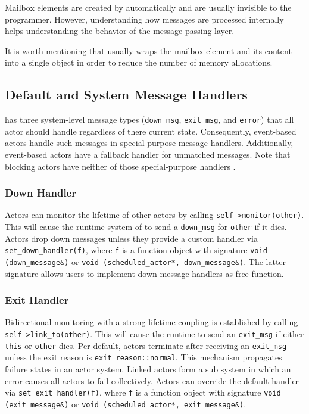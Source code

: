 Mailbox elements are created by \lib automatically and are usually invisible to the programmer. However, understanding how messages are processed internally helps understanding the behavior of the message passing layer.

It is worth mentioning that \lib usually wraps the mailbox element and its content into a single object in order to reduce the number of memory allocations.

\subsection{Default and System Message Handlers}
\label{special-handler}

\lib has three system-level message types (\lstinline^down_msg^, \lstinline^exit_msg^, and \lstinline^error^) that all actor should handle regardless of there current state. Consequently, event-based actors handle such messages in special-purpose message handlers. Additionally, event-based actors have a fallback handler for unmatched messages. Note that blocking actors have neither of those special-purpose handlers .

\subsubsection{Down  Handler}
\label{down-message}

Actors can monitor the lifetime of other actors by calling \lstinline^self->monitor(other)^. This will cause the runtime system of \lib to send a \lstinline^down_msg^ for \lstinline^other^ if it dies. Actors drop down messages unless they provide a custom handler via \lstinline^set_down_handler(f)^, where \lstinline^f^ is a function object with signature \lstinline^void (down_message&)^ or \lstinline^void (scheduled_actor*, down_message&)^. The latter signature allows users to implement down message handlers as free function.

\subsubsection{Exit Handler}
\label{exit-message}

Bidirectional monitoring with a strong lifetime coupling is established by calling \lstinline^self->link_to(other)^. This will cause the runtime to send an \lstinline^exit_msg^ if either \lstinline^this^ or \lstinline^other^ dies. Per default, actors terminate after receiving an \lstinline^exit_msg^ unless the exit reason is \lstinline^exit_reason::normal^. This mechanism propagates failure states in an actor system. Linked actors form a sub system in which an error causes all actors to fail collectively. Actors can override the default handler via \lstinline^set_exit_handler(f)^, where \lstinline^f^ is a function object with signature \lstinline^void (exit_message&)^ or \lstinline^void (scheduled_actor*, exit_message&)^.

